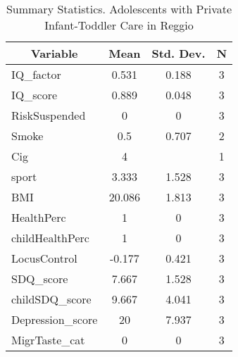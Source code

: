 
\begin{table}[htbp]\centering \caption{Summary Statistics. Adolescents with Private Infant-Toddler Care in Reggio \label{bothAdolasiloPrivReggio}}
\begin{tabular}{l c c  c}\hline\hline
\multicolumn{1}{c}{\textbf{Variable}} & \textbf{Mean}
 & \textbf{Std. Dev.} & \textbf{N}\\ \hline
IQ\_factor & 0.531 & 0.188  & 3\\
IQ\_score & 0.889 & 0.048  & 3\\
RiskSuspended & 0 & 0  & 3\\
Smoke & 0.5 & 0.707  & 2\\
Cig & 4 &   & 1\\
sport & 3.333 & 1.528  & 3\\
BMI & 20.086 & 1.813  & 3\\
HealthPerc & 1 & 0  & 3\\
childHealthPerc & 1 & 0  & 3\\
LocusControl & -0.177 & 0.421  & 3\\
SDQ\_score & 7.667 & 1.528  & 3\\
childSDQ\_score & 9.667 & 4.041  & 3\\
Depression\_score & 20 & 7.937  & 3\\
MigrTaste\_cat & 0 & 0  & 3\\
\hline\end{tabular}
\end{table}
